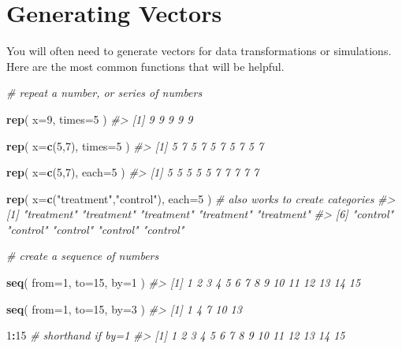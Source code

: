 \documentclass[]{book}
\newenvironment{Shaded}{\begin{snugshade}}{\end{snugshade}}
\newcommand{\CommentTok}[1]{\textcolor[rgb]{0.56,0.35,0.01}{\textit{#1}}}
\newcommand{\DataTypeTok}[1]{\textcolor[rgb]{0.13,0.29,0.53}{#1}}
\newcommand{\DecValTok}[1]{\textcolor[rgb]{0.00,0.00,0.81}{#1}}
\newcommand{\KeywordTok}[1]{\textcolor[rgb]{0.13,0.29,0.53}{\textbf{#1}}}
\newcommand{\NormalTok}[1]{#1}
\newcommand{\OperatorTok}[1]{\textcolor[rgb]{0.81,0.36,0.00}{\textbf{#1}}}
\newcommand{\StringTok}[1]{\textcolor[rgb]{0.31,0.60,0.02}{#1}}
\theoremstyle{definition}
\theoremstyle{definition}
\theoremstyle{definition}
\theoremstyle{remark}
\begin{document}
\hypertarget{generating-vectors}{%
\section{Generating Vectors}\label{generating-vectors}}

You will often need to generate vectors for data transformations or
simulations. Here are the most common functions that will be helpful.

\begin{Shaded}
\begin{Highlighting}[]

\CommentTok{# repeat a number, or series of numbers}

\KeywordTok{rep}\NormalTok{( }\DataTypeTok{x=}\DecValTok{9}\NormalTok{, }\DataTypeTok{times=}\DecValTok{5}\NormalTok{ )}
\CommentTok{#> [1] 9 9 9 9 9}

\KeywordTok{rep}\NormalTok{( }\DataTypeTok{x=}\KeywordTok{c}\NormalTok{(}\DecValTok{5}\NormalTok{,}\DecValTok{7}\NormalTok{), }\DataTypeTok{times=}\DecValTok{5}\NormalTok{ )}
\CommentTok{#>  [1] 5 7 5 7 5 7 5 7 5 7}

\KeywordTok{rep}\NormalTok{( }\DataTypeTok{x=}\KeywordTok{c}\NormalTok{(}\DecValTok{5}\NormalTok{,}\DecValTok{7}\NormalTok{), }\DataTypeTok{each=}\DecValTok{5}\NormalTok{ )}
\CommentTok{#>  [1] 5 5 5 5 5 7 7 7 7 7}

\KeywordTok{rep}\NormalTok{( }\DataTypeTok{x=}\KeywordTok{c}\NormalTok{(}\StringTok{"treatment"}\NormalTok{,}\StringTok{"control"}\NormalTok{), }\DataTypeTok{each=}\DecValTok{5}\NormalTok{ )  }\CommentTok{# also works to create categories}
\CommentTok{#>  [1] "treatment" "treatment" "treatment" "treatment" "treatment"}
\CommentTok{#>  [6] "control"   "control"   "control"   "control"   "control"}


\CommentTok{# create a sequence of numbers}

\KeywordTok{seq}\NormalTok{( }\DataTypeTok{from=}\DecValTok{1}\NormalTok{, }\DataTypeTok{to=}\DecValTok{15}\NormalTok{, }\DataTypeTok{by=}\DecValTok{1}\NormalTok{ )}
\CommentTok{#>  [1]  1  2  3  4  5  6  7  8  9 10 11 12 13 14 15}

\KeywordTok{seq}\NormalTok{( }\DataTypeTok{from=}\DecValTok{1}\NormalTok{, }\DataTypeTok{to=}\DecValTok{15}\NormalTok{, }\DataTypeTok{by=}\DecValTok{3}\NormalTok{ )}
\CommentTok{#> [1]  1  4  7 10 13}

\DecValTok{1}\OperatorTok{:}\DecValTok{15}   \CommentTok{# shorthand if by=1}
\CommentTok{#>  [1]  1  2  3  4  5  6  7  8  9 10 11 12 13 14 15}




\end{Highlighting}
\end{Shaded}
\end{document}
